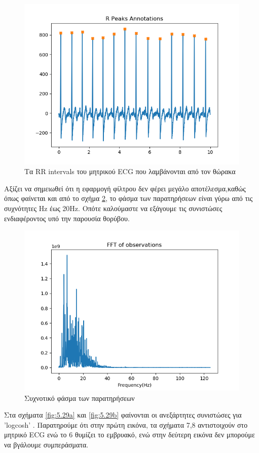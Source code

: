 \begin{figure}[H]
    \centering
    \includegraphics[width=0.7 \textwidth]{daisy/maternal_reference.png}
    \caption{Τα \en RR intervals \gr του μητρικού \en ECG \gr που λαμβάνονται από τον θώρακα}
    \label{fig:5.28}
\end{figure}
\noindent Αξίζει να σημειωθεί ότι η εφαρμογή φίλτρου δεν φέρει μεγάλο αποτέλεσμα,καθώς όπως φαίνεται και από το σχήμα \ref{fig:5.35}, το φάσμα των παρατηρήσεων είναι γύρω από τις συχνότητες  Hz  \gr έως \en 20Hz. \gr Οπότε καλούμαστε να εξάγουμε τις συνιστώσες ενδιαφέροντος υπό την παρουσία θορύβου.
\begin{figure}[H]
    \centering
    \includegraphics[width=0.7 \textwidth]{daisy/fft.png}
    \caption{Συχνοτικό φάσμα των παρατηρήσεων}
    \label{fig:5.35}
\end{figure}
\noindent Στα σχήματα \ref{fig:5.29a} και \ref{fig:5.29b} φαίνονται οι ανεξάρτητες συνιστώσες για \en 'logcosh' \gr. Παρατηρούμε ότι στην πρώτη εικόνα, τα σχήματα 7,8 αντιστοιχούν στο μητρικό \en ECG \gr ενώ το 6 θυμίζει το εμβρυακό, ενώ στην δεύτερη εικόνα δεν μπορούμε να βγάλουμε συμπεράσματα. 
